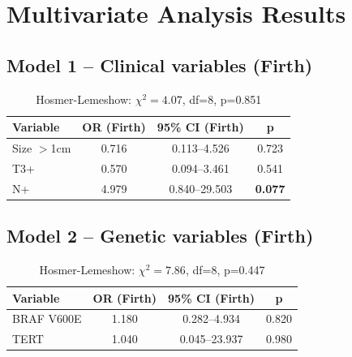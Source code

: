 \documentclass[12pt,a4paper]{article}
\begin{document}
\section{Multivariate Analysis Results}

\subsection{Model 1 -- Clinical variables (Firth)}
\begin{table}[H]
\centering
\caption{Multivariate Firth analysis -- Clinical model (N=114, events=7)}
\label{tab:multi1}
\begin{tabular}{lccc}
\toprule
Variable & OR (Firth) & 95\% CI (Firth) & p \\
\midrule
Size $>$1cm     & 0.716 & 0.113--4.526  & 0.723 \\
T3+         & 0.570 & 0.094--3.461  & 0.541 \\
N+          & 4.979 & 0.840--29.503 & \textbf{0.077} \\
\bottomrule
\end{tabular}
\caption*{Hosmer-Lemeshow: $\chi^2=4.07$, df=8, p=0.851}
\end{table}

\subsection{Model 2 -- Genetic variables (Firth)}
\begin{table}[H]
\centering
\caption{Multivariate Firth analysis -- Genetic model (N=114, events=7)}
\label{tab:multi2}
\begin{tabular}{lccc}
\toprule
Variable & OR (Firth) & 95\% CI (Firth) & p \\
\midrule
BRAF V600E & 1.180 & 0.282--4.934 & 0.820 \\
TERT       & 1.040 & 0.045--23.937 & 0.980 \\
\bottomrule
\end{tabular}
\caption*{Hosmer-Lemeshow: $\chi^2=7.86$, df=8, p=0.447}
\end{table}
\end{document}
